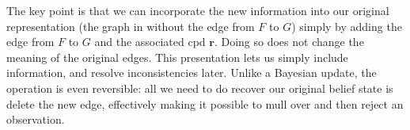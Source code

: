 \documentclass{article}
\theoremstyle{plain}
\theoremstyle{definition}
\newenvironment{example}
	{\pushQED{\qed}\renewcommand{\qedsymbol}{$\triangle$}\examplex}
	{\popQED\endexamplex%
}
\theoremstyle{remark}
\newcommand\mat[1]{\mathbf{#1}}
\numberwithin{equation}{section}
\begin{document}
\begin{example}
		The key point is that we can incorporate the new information into
		our original representation (the graph in 
		without the edge from $F$ to $G$) simply  by adding the edge from $F$
		to $G$ and the associated cpd $\mat r$.  Doing so does not change the meaning
		of the original edges.  This presentation lets us simply include
		information, and resolve inconsistencies later. Unlike a Bayesian
		update, the operation is even reversible: all we need to do recover
		our original belief state is delete the new edge, effectively making
		it possible to mull over and then reject an observation.
	\end{example}

\end{document}
